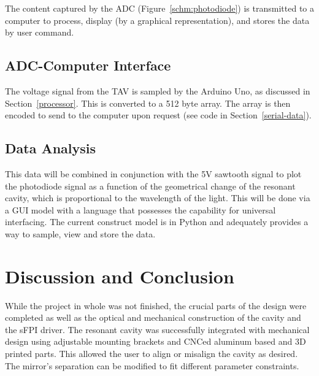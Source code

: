 \documentclass[12pt,journal]{IEEEtran}
\begin{document}
The content captured by the ADC (Figure~\ref{schm:photodiode}) is transmitted to a computer to process, display (by a graphical representation), and stores the data by user command.  


\subsection{ADC-Computer Interface}

The voltage signal from the TAV is sampled by the Arduino Uno, as discussed in Section~\ref{processor}. This is converted to a 512 byte array. The array is then encoded to send to the computer upon request (see code in Section~\ref{serial-data}).


\subsection{Data Analysis}

This data will be combined in conjunction with the 5V sawtooth signal to plot the photodiode signal as a function of the geometrical change of the resonant cavity, which is proportional to the wavelength of the light. This will be done via a GUI model with a language that possesses the capability for universal interfacing. The current construct model is in Python and adequately provides a way to sample, view and store the data.


\section{Discussion and Conclusion}

While the project in whole was not finished, the crucial parts of the design were completed as well as the optical and mechanical construction of the cavity and the sFPI driver. The resonant cavity was successfully integrated with mechanical design using adjustable mounting brackets and CNCed aluminum based and 3D printed parts. This allowed the user to align or misalign the cavity as desired. The mirror's separation can be modified to fit different parameter constraints. 
\end{document}
